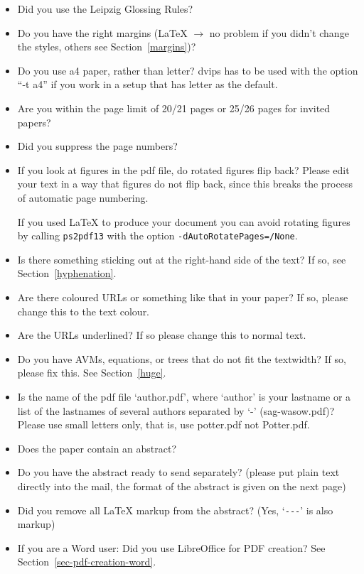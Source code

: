 \documentclass[11pt,a4paper,fleqn]{article}
\begin{document}
\begin{itemize}
\item Did you use the Leipzig Glossing Rules?
\item Do you have the right margins (\LaTeX{} $\to$ no problem if you didn't change
      the styles, others see Section~\ref{margins})?
\item Do you use a4 paper, rather than letter? dvips has to be used with the option ``-t a4'' if you
  work in a setup that has letter as the default.
\item Are you within the page limit of 20/21 pages or 25/26 pages for invited papers?
\item Did you suppress the page numbers?
\item If you look at figures in the pdf file, do rotated figures flip back?
      Please edit your text in a way that figures do not flip back, since this
      breaks the process of automatic page numbering.

If you used \LaTeX{} to produce your document you can avoid rotating figures by calling
\verb+ps2pdf13+ with the option \verb+-dAutoRotatePages=/None+.
\item Is there something sticking out at the right-hand side of the text?
      If so, see Section~\ref{hyphenation}.
\item Are there coloured URLs or something like that in your paper? If so,
      please change this to the text colour.
\item Are the URLs underlined? If so please change this to normal text.
\item Do you have AVMs, equations, or trees that do not fit the textwidth?
      If so, please fix this. See Section~\ref{huge}.
\item Is the name of the pdf file `author.pdf', where `author' is your lastname or a list of the lastnames of several authors
      separated by `-' (sag-wasow.pdf)? Please use small letters only, that is, use potter.pdf not Potter.pdf.
\item Does the paper contain an abstract?
\item Do you have the abstract ready to send separately? (please put plain text directly into the mail, the
format of the abstract is given on the next page)
\item Did you remove all \LaTeX{} markup from the abstract? (Yes, `\verb+---+' is also markup)
\item If you are a Word user: Did you use LibreOffice for PDF creation? See Section~\ref{sec-pdf-creation-word}.
\end{itemize}
\end{document}
